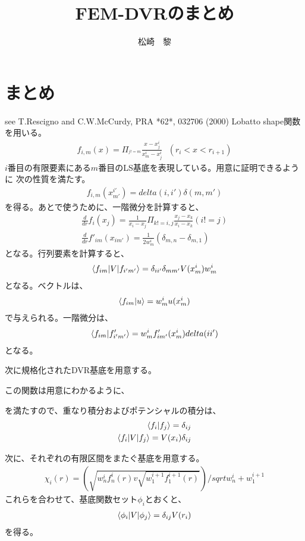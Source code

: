 \documentclass[a4paper]{jsarticle}
\def\braces#1{\left( #1 \right)}
\begin{document}
\title{FEM-DVRのまとめ}
\author{松崎　黎}
\maketitle

\section{まとめ}
see T.Rescigno and C.W.McCurdy, PRA *62*, 032706 (2000)
Lobatto shape関数を用いる。
\begin{eqnarray}
  f_{i,m}(x) = \Pi_^{j!=m} \frac{x-x_j^i}{x_m^i-x_j^i} \ \ \ (r_i<x<r_{i+1})
\end{eqnarray}
$i$番目の有限要素にある$m$番目のLS基底を表現している。用意に証明できるように
次の性質を満たす。
\begin{eqnarray}
  f_{i,m}(x^{i'}_{m'}) = delta(i,i')\delta(m,m')
\end{eqnarray}
を得る。あとで使うために、一階微分を計算すると、
\begin{eqnarray}
  \frac{d}{dr} f_i(x_j) = \frac{1}{x_i-x_j} \Pi_{k!=i,j} \frac{x_j-x_k}{x_i-x_k} (i!=j) \\
  \frac{d}{dr} f'_{im}(x_{im'}) = \frac{1}{2w^i_m}(\delta_{m,n} - \delta_{m,1})
\end{eqnarray}
となる。行列要素を計算すると、
\begin{eqnarray}
  \braket{f_{im} | V | f_{i'm'}} = \delta_{ii'}\delta_{mm'}V(x^i_m)w^i_m
\end{eqnarray}
となる。ベクトルは、
\begin{eqnarray}
  \braket{f_{im} | u} = w^i_m u(x^i_m)
\end{eqnarray}
で与えられる。一階微分は、
\begin{eqnarray}
  \braket{f_{im} | f'_{i'm'}} = w^i_m f'_{im'}(x^i_m) delta(ii')
\end{eqnarray}
となる。

次に規格化されたDVR基底を用意する。

この関数は用意にわかるように、

を満たすので、重なり積分およびポテンシャルの積分は、
\begin{eqnarray}
  \braket{f_i | f_j} = \delta_{ij}\\
    \braket{f_i |V| f_j} = V(x_i)\delta_{ij}\\
\end{eqnarray}


次に、それぞれの有限区間をまたぐ基底を用意する。
\begin{eqnarray}
  \chi_i(r) = \braces{\sqrt{w_n^if^i_n(r) v \sqrt{w_1^{i+1}f^{i+1}_1(r)}}}/sqrt{w^i_n+w^{i+1}_1}
\end{eqnarray}
これらを合わせて、基底関数セット$\phi_i$とおくと、
\begin{eqnarray}
  \braket{\phi_i |V| \phi_j} = \delta_{ij}V(r_i)
\end{eqnarray}
を得る。



\end{document}

